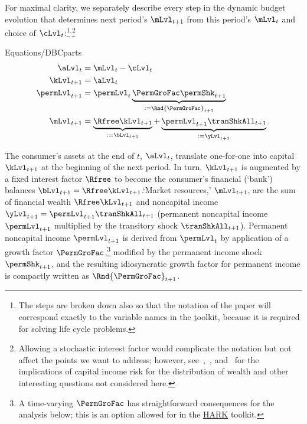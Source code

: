\documentclass[BufferStockTheory]{subfiles}
\begin{document}
\hypertarget{checkRestrictions}{}
\hypertarget{DBCparts}{}
For maximal clarity, we separately describe every step in the dynamic budget evolution that determines next period's $\mLvl_{t+1}$ from this period's $\mLvl_{t}$ and choice of $\cLvl_{t}$:\footnote{The steps are broken down also so that the notation of the paper will correspond exactly to the variable names in the \href{https://github.com/econ-ark/HARK} toolkit, because it is required for solving life cycle problems.}$^{,}$\footnote{Allowing a stochastic interest factor would complicate the notation but not affect the points we want to address; however, see~\cite{benhabibWealth},~\cite{maTodaRich}, and~\cite{mstIncFluct} for the implications of capital income risk for the distribution of wealth and other interesting questions not considered here.}

\begin{verbatimwrite}{Equations/DBCparts}
  \begin{equation}\label{eq:DBCparts} %
    \begin{split}
      \aLvl_{t}     & = \mLvl_{t}-\cLvl_{t}  \\
      \kLvl_{t+1}   & = \aLvl_{t} \notag \\
      \permLvl_{t+1}  & = \permLvl_{t} \underbrace{\PermGroFac\permShk_{t+1}}_{:= \Rnd{\PermGroFac}_{t+1}} \notag \\
      \mLvl_{t+1}  & =   \underbrace{\Rfree \kLvl_{t+1}}_{:= \bLvl_{t+1}}  +\underbrace{\permLvl_{t+1}\tranShkAll_{t+1}}_{:= \yLvl_{t+1}}. \notag
    \end{split}
  \end{equation}
\end{verbatimwrite}


The consumer's assets at the end of $t$, $\aLvl_{t}$, translate one-for-one into capital $\kLvl_{t+1}$ at the beginning of the next period.
In turn, $\kLvl_{t+1}$ is augmented by a fixed interest factor $\Rfree$ to become the consumer's financial (`bank') balances $\bLvl_{t+1} = \Rfree \kLvl_{t+1}$.`Market resources,' $\mLvl_{t+1}$,  are the sum of financial wealth $\Rfree \kLvl_{t+1}$ and noncapital income $\yLvl_{t+1}=\permLvl_{t+1}\tranShkAll_{t+1}$ (permanent noncapital income $\permLvl_{t+1}$ multiplied by the transitory shock $\tranShkAll_{t+1}$).
Permanent noncapital income $\permLvl_{t+1}$ is derived from $\permLvl_{t}$ by application of a growth factor $\PermGroFac$,\footnote{A time-varying $\PermGroFac$ has straightforward consequences for the analysis below; this is an option allowed for in the \href{https://econ-ark.org}{HARK} toolkit.} modified by the permanent income shock $\permShk_{t+1}$, and the resulting idiosyncratic growth factor for permanent income is compactly written as $\Rnd{\PermGroFac}_{t+1}$.
\end{document}
